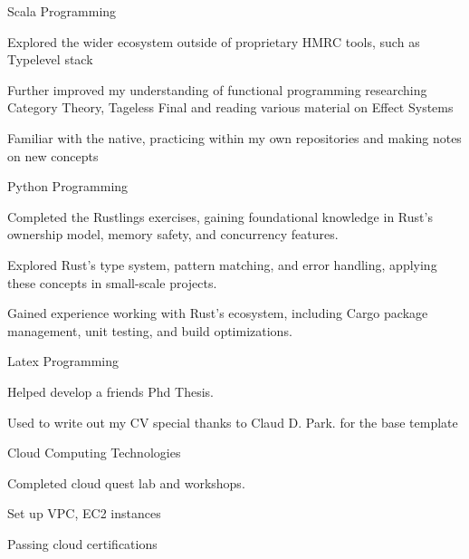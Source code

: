 \begin{cventries}
  \cventry
  {Scala Programming} %
  {} %
  {} %
  {} %
  {
    \begin{cvitems}
      \item {Explored the wider ecosystem outside of proprietary HMRC tools, such as Typelevel stack}
      \item {Further improved my understanding of functional programming researching Category Theory, Tageless Final and reading various material on Effect Systems}
      \item {Familiar with the native, practicing within my own repositories and making notes on new concepts}
    \end{cvitems}
  }
  \cventry
  {Python Programming} %
  {} %
  {} %
  {} %
  {
    \begin{cvitems}
      \item {Completed the Rustlings exercises, gaining foundational knowledge in Rust’s ownership model, memory safety, and concurrency features.}
      \item {Explored Rust’s type system, pattern matching, and error handling, applying these concepts in small-scale projects.}
      \item {Gained experience working with Rust’s ecosystem, including Cargo package management, unit testing, and build optimizations.}
    \end{cvitems}
  }
\cventry
{Latex Programming} %
{} %
{} %
{} %
{
  \begin{cvitems}
    \item {Helped develop a friends Phd Thesis.}
    \item {Used to write out my CV special thanks to Claud D. Park. for the base template }
  \end{cvitems}
}

  \cventry
  {Cloud Computing Technologies} %
  {} %
  {} %
  {} %
  {
    \begin{cvitems}
      \item {Completed cloud quest lab and workshops.}
      \item {Set up VPC,  EC2 instances}
      \item {Passing cloud certifications}
    \end{cvitems}
  }

\end{cventries}
